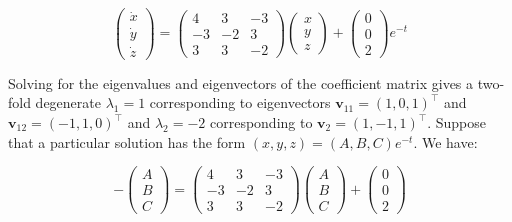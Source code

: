 \documentclass[12pt]{article}
\begin{document}
\begin{equation}
    \begin{pmatrix}
        \dot{x} \\
        \dot{y} \\
        \dot{z}
    \end{pmatrix}
    =
    \begin{pmatrix}
        4  & 3  & -3 \\
        -3 & -2 & 3  \\
        3  & 3  & -2
    \end{pmatrix}
    \begin{pmatrix}
        x \\
        y \\
        z
    \end{pmatrix}
    +
    \begin{pmatrix}
        0 \\
        0 \\
        2
    \end{pmatrix}
    e^{-t}
\end{equation}

Solving for the eigenvalues and eigenvectors of the coefficient matrix gives a two-fold degenerate $\lambda_{1} = 1$ corresponding to eigenvectors $\mathbf{v}_{11} = (1, 0, 1)^{\intercal}$ and $\mathbf{v}_{12} = (-1, 1, 0)^{\intercal}$ and $\lambda_{2} = -2$ corresponding to $\mathbf{v}_{2} = (1, -1, 1)^{\intercal}$. Suppose that a particular solution has the form $(x, y, z) = (A, B, C)e^{-t}$. We have:

\begin{equation}
    -\begin{pmatrix}
        A \\
        B \\
        C
    \end{pmatrix}
    =
    \begin{pmatrix}
        4  & 3  & -3 \\
        -3 & -2 & 3  \\
        3  & 3  & -2
    \end{pmatrix}
    \begin{pmatrix}
        A \\
        B \\
        C
    \end{pmatrix}
    +
    \begin{pmatrix}
        0 \\
        0 \\
        2
    \end{pmatrix}
\end{equation}
\end{document}
